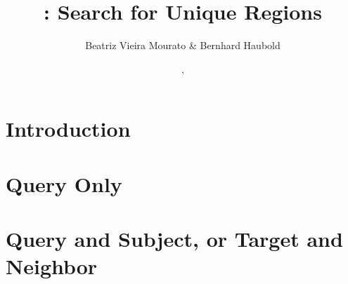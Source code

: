 \documentclass[a4paper]{report}
\begin{document}
\pagestyle{noweb}

\title{: Search for Unique Regions}
\author{Beatriz Vieira Mourato \& Bernhard Haubold}
\date{\!\!, }
\maketitle

\tableofcontents

\chapter{Introduction}

\chapter{Query Only}\label{ch:q}


\chapter{Query and Subject, or Target and Neighbor}\label{ch:qs}




\end{document}
